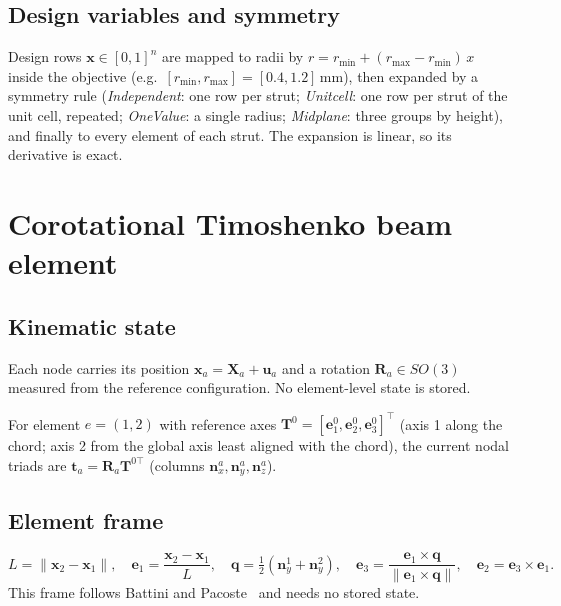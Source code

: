 \documentclass[11pt,a4paper]{article}
\newcommand{\vect}[1]{\bm{#1}}
\newcommand{\mat}[1]{\mathbf{#1}}
\begin{document}
\subsection{Design variables and symmetry}
Design rows $\vect{x}\in[0,1]^{n}$ are mapped to radii by $r = r_{\min} + (r_{\max}-r_{\min})\,x$ inside the
objective (e.g.\ $[r_{\min}, r_{\max}] = [0.4, 1.2]$\,mm), then expanded by a symmetry rule
(\emph{Independent}: one row per strut; \emph{Unitcell}: one row per strut of the unit cell, repeated;
\emph{OneValue}: a single radius; \emph{Midplane}: three groups by height), and finally to every element of
each strut. The expansion is linear, so its derivative is exact.

\section{Corotational Timoshenko beam element}
\label{sec:element}
\subsection{Kinematic state}
Each node carries its position $\vect{x}_a = \vect{X}_a + \vect{u}_a$ and a rotation $\mat{R}_a\in SO(3)$
measured from the reference configuration. No element-level state is stored.

For element $e=(1,2)$ with reference axes $\mat{T}^0 = [\vect{e}^0_1, \vect{e}^0_2, \vect{e}^0_3]^\top$
(axis 1 along the chord; axis 2 from the global axis least aligned with the chord), the current nodal triads are
$\mat{t}_a = \mat{R}_a \mat{T}^{0\top}$ (columns $\vect{n}^a_x, \vect{n}^a_y, \vect{n}^a_z$).

\subsection{Element frame}
\begin{equation}
L = \lVert \vect{x}_2-\vect{x}_1\rVert,\quad
\vect{e}_1 = \frac{\vect{x}_2-\vect{x}_1}{L},\quad
\vect{q} = \tfrac12\left(\vect{n}^1_y + \vect{n}^2_y\right),\quad
\vect{e}_3 = \frac{\vect{e}_1\times\vect{q}}{\lVert \vect{e}_1\times\vect{q}\rVert},\quad
\vect{e}_2 = \vect{e}_3\times\vect{e}_1 .
\end{equation}
This frame follows Battini and Pacoste~\cite{battini2002} and needs no stored state.
\end{document}
